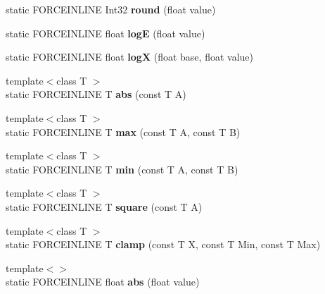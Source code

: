 \begin{DoxyCompactItemize}
\mbox{\label{structdrider_s_d_k_1_1_math_aa2949bed1f392e7c618612492cfa8e47}} 
static F\+O\+R\+C\+E\+I\+N\+L\+I\+NE Int32 {\bfseries round} (float value)
\item 
\mbox{\label{structdrider_s_d_k_1_1_math_a87bbea51a396c7e2995745f19139b64f}} 
static F\+O\+R\+C\+E\+I\+N\+L\+I\+NE float {\bfseries logE} (float value)
\item 
\mbox{\label{structdrider_s_d_k_1_1_math_a1628627e6b17b4453347f6f8384da151}} 
static F\+O\+R\+C\+E\+I\+N\+L\+I\+NE float {\bfseries logX} (float base, float value)
\item 
\mbox{\label{structdrider_s_d_k_1_1_math_af3cd91c2956683e0fd9a90b89683887c}} 
{\footnotesize template$<$class T $>$ }\\static F\+O\+R\+C\+E\+I\+N\+L\+I\+NE T {\bfseries abs} (const T A)
\item 
\mbox{\label{structdrider_s_d_k_1_1_math_ad3a0d8c4c62e98dd2dcc04454fe3fb64}} 
{\footnotesize template$<$class T $>$ }\\static F\+O\+R\+C\+E\+I\+N\+L\+I\+NE T {\bfseries max} (const T A, const T B)
\item 
\mbox{\label{structdrider_s_d_k_1_1_math_a2e83ad34b547e17201f3a8afea95edec}} 
{\footnotesize template$<$class T $>$ }\\static F\+O\+R\+C\+E\+I\+N\+L\+I\+NE T {\bfseries min} (const T A, const T B)
\item 
\mbox{\label{structdrider_s_d_k_1_1_math_a0d54cfe4b99d3ce390591639abc3b078}} 
{\footnotesize template$<$class T $>$ }\\static F\+O\+R\+C\+E\+I\+N\+L\+I\+NE T {\bfseries square} (const T A)
\item 
\mbox{\label{structdrider_s_d_k_1_1_math_ab0f1e1c6f3f20918475ed5a559d6697c}} 
{\footnotesize template$<$class T $>$ }\\static F\+O\+R\+C\+E\+I\+N\+L\+I\+NE T {\bfseries clamp} (const T X, const T Min, const T Max)
\item 
\mbox{\label{structdrider_s_d_k_1_1_math_a307876106db2aab6a852b9270ee59388}} 
{\footnotesize template$<$$>$ }\\static F\+O\+R\+C\+E\+I\+N\+L\+I\+NE float {\bfseries abs} (float value)
\end{DoxyCompactItemize}
